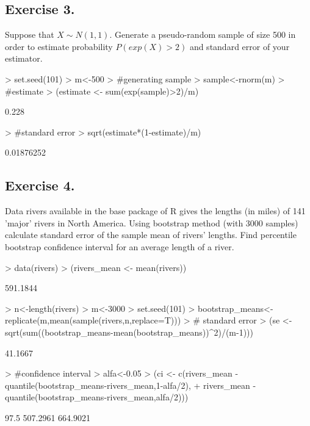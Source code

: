 \documentclass[a4paper]{article}
\begin{document}
\subsection{Exercise 3.} Suppose that $X \sim N(1,1)$. Generate a pseudo-random
sample of size 500 in order to estimate probability $P(exp(X)>2)$ and standard
error of your estimator.
\begin{Schunk}
\begin{Sinput}
> set.seed(101)
> m<-500
> #generating sample
> sample<-rnorm(m)
> #estimate
> (estimate <- sum(exp(sample)>2)/m)
\end{Sinput}
\begin{Soutput}
[1] 0.228
\end{Soutput}
\begin{Sinput}
> #standard error
> sqrt(estimate*(1-estimate)/m)
\end{Sinput}
\begin{Soutput}
[1] 0.01876252
\end{Soutput}
\end{Schunk}
\subsection{Exercise 4.} Data rivers  available in the base package of R  gives
the lengths (in miles) of 141 'major' rivers in North America. 
Using bootstrap method (with 3000 samples) calculate standard error of the sample mean of rivers' lengths. 
Find percentile bootstrap confidence interval for an average length of a river.

\begin{Schunk}
\begin{Sinput}
> data(rivers)
> (rivers_mean <- mean(rivers))
\end{Sinput}
\begin{Soutput}
[1] 591.1844
\end{Soutput}
\begin{Sinput}
> n<-length(rivers)
> m<-3000
> set.seed(101)
> bootstrap_means<-replicate(m,mean(sample(rivers,n,replace=T)))
> # standard error
> (se <- sqrt(sum((bootstrap_means-mean(bootstrap_means))^2)/(m-1)))
\end{Sinput}
\begin{Soutput}
[1] 41.1667
\end{Soutput}
\begin{Sinput}
> #confidence interval
> alfa<-0.05
> (ci <- c(rivers_mean - quantile(bootstrap_means-rivers_mean,1-alfa/2), 
+ 					rivers_mean - quantile(bootstrap_means-rivers_mean,alfa/2)))
\end{Sinput}
\begin{Soutput}
   97.5%     2.5% 
507.2961 664.9021 
\end{Soutput}
\end{Schunk}
\end{document}

